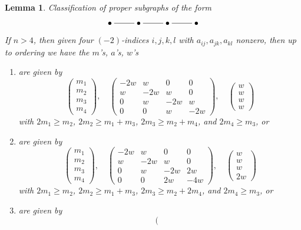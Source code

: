 \documentclass{stacks-project}
\theoremstyle{plain}
\newtheorem{lemma}[subsection]{Lemma}
\theoremstyle{definition}
\theoremstyle{remark}
\numberwithin{equation}{subsection}
\begin{document}
\begin{lemma}
\label{lemma-four-by-four}
Classification of proper subgraphs of the form
$$
\xymatrix{
\bullet \ar@{-}[r] &
\bullet \ar@{-}[r] &
\bullet \ar@{-}[r] &
\bullet
}
$$
If $n > 4$, then given four $(-2)$-indices $i, j, k, l$
with $a_{ij}, a_{jk}, a_{kl}$ nonzero, then up
to ordering we have the $m$'s, $a$'s, $w$'s
\begin{enumerate}
\item
\label{item-A4}
are given by
$$
\left(
\begin{matrix}
m_1 \\
m_2 \\
m_3 \\
m_4
\end{matrix}
\right),
\quad
\left(
\begin{matrix}
-2w & w & 0 & 0 \\
w & -2w & w & 0 \\
0 & w & -2w & w \\
0 & 0 & w & -2w 
\end{matrix}
\right),
\quad
\left(
\begin{matrix}
w \\
w \\
w \\
w
\end{matrix}
\right)
$$
with $2m_1 \geq m_2$, $2m_2 \geq m_1 + m_3$, $2m_3 \geq m_2 + m_4$,
and $2m_4 \geq m_3$, or
\item
\label{item-C4}
are given by
$$
\left(
\begin{matrix}
m_1 \\
m_2 \\
m_3 \\
m_4
\end{matrix}
\right),
\quad
\left(
\begin{matrix}
-2w & w & 0 & 0 \\
w & -2w & w & 0 \\
0 & w & -2w & 2w \\
0 & 0 & 2w & -4w 
\end{matrix}
\right),
\quad
\left(
\begin{matrix}
w \\
w \\
w \\
2w
\end{matrix}
\right)
$$
with $2m_1 \geq m_2$, $2m_2 \geq m_1 + m_3$, $2m_3 \geq m_2 + 2m_4$,
and $2m_4 \geq m_3$, or
\item
\label{item-B4}
are given by
$$
\left(
\begin{matrix}

\end{matrix}$$
\end{enumerate}
\end{lemma}
\end{document}
